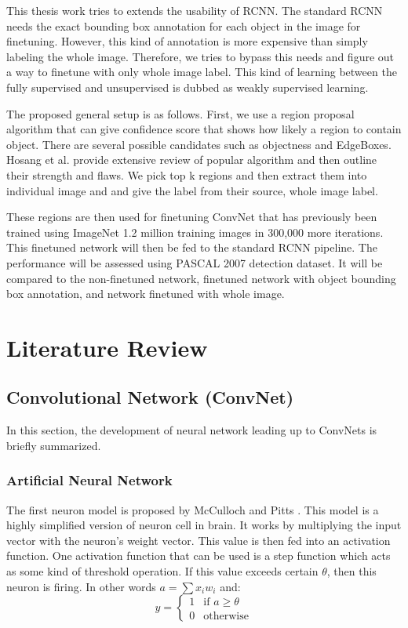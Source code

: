 \documentclass[a4paper,11pt]{kth-mag}
\begin{document}
This thesis work tries to extends the usability of RCNN. The standard RCNN needs the exact bounding box annotation for each object in the image for finetuning. However, this kind of annotation is more expensive than simply labeling the whole image. Therefore, we tries to bypass this needs and figure out a way to finetune with only whole image label. This kind of learning between the fully supervised and unsupervised is dubbed as weakly supervised learning.

The proposed general setup is as follows. First, we use a region proposal algorithm that can give confidence score that shows how likely a region to contain object. There are several possible candidates such as objectness \cite{obj} and EdgeBoxes. Hosang et al. \cite{hosang2014} provide extensive review of popular algorithm and then outline their strength and flaws. We pick top k regions and then extract them into individual image and and give the label from their source, whole image label.

These regions are then used for finetuning ConvNet that has previously been trained using ImageNet 1.2 million training images in 300,000 more iterations. This finetuned network will then be fed to the standard RCNN pipeline. The performance will be assessed using PASCAL 2007 detection dataset. It will be compared to the non-finetuned network, finetuned network with object bounding box annotation, and network finetuned with whole image.


\chapter{Literature Review}

\section{Convolutional Network (ConvNet)}
In this section, the development of neural network leading up to ConvNets is briefly summarized.

\subsection{Artificial Neural Network}
The first neuron model is proposed by McCulloch and Pitts \cite{mcculloch1943neuron}. This model is a highly simplified version of neuron cell in brain. It works by multiplying the input vector with the neuron's weight vector. This value is then fed into an activation function. One activation function that can be used is a step function which acts as some kind of threshold operation. If this value exceeds certain $\theta$, then this neuron is firing. In other words $ a = \sum x_i w_i $ and:
\begin{equation}
y = 
	\begin{cases}
	1 & \text{if } a \geq \theta \\
	0 & \text{otherwise}
	\end{cases}
\end{equation}
\end{document}
